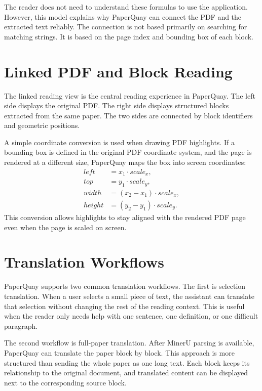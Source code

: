 ﻿\documentclass[11pt,a4paper]{article}
\begin{document}
The reader does not need to understand these formulas to use the application. However, this model explains why PaperQuay can connect the PDF and the extracted text reliably. The connection is not based primarily on searching for matching strings. It is based on the page index and bounding box of each block.

\section{Linked PDF and Block Reading}

The linked reading view is the central reading experience in PaperQuay. The left side displays the original PDF. The right side displays structured blocks extracted from the same paper. The two sides are connected by block identifiers and geometric positions.

A simple coordinate conversion is used when drawing PDF highlights. If a bounding box is defined in the original PDF coordinate system, and the page is rendered at a different size, PaperQuay maps the box into screen coordinates:
\begin{align}
left &= x_1 \cdot scale_x, \\
top &= y_1 \cdot scale_y, \\
width &= (x_2 - x_1) \cdot scale_x, \\
height &= (y_2 - y_1) \cdot scale_y.
\end{align}
This conversion allows highlights to stay aligned with the rendered PDF page even when the page is scaled on screen.

\section{Translation Workflows}

PaperQuay supports two common translation workflows. The first is selection translation. When a user selects a small piece of text, the assistant can translate that selection without changing the rest of the reading context. This is useful when the reader only needs help with one sentence, one definition, or one difficult paragraph.

The second workflow is full-paper translation. After MinerU parsing is available, PaperQuay can translate the paper block by block. This approach is more structured than sending the whole paper as one long text. Each block keeps its relationship to the original document, and translated content can be displayed next to the corresponding source block.
\end{document}
